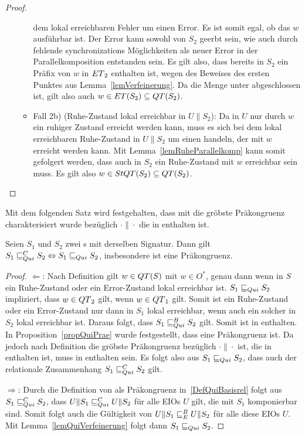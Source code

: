 \begin{proof}
\begin{itemize}
\begin{itemize}
          dem lokal erreichbaren Fehler um einen Error. Es ist somit egal, ob
          das $w$ ausführbar ist. Der Error kann sowohl von $S_2$ geerbt sein,
          wie auch durch fehlende synchronizations Möglichkeiten als neuer
          Error in der Parallelkomposition entstanden sein. Es gilt also, dass
          bereits in $S_2$ ein Präfix von $w$ in $ET{}_2$ enthalten ist, wegen
          des Beweises des ersten Punktes aus Lemma~\ref{lemVerfeinerung}. Da
          die Menge \ET{} unter \cont{} abgeschlossen ist, gilt also auch $w\in
          ET{}(S_2)\subseteq QT{}(S_2)$.
        \item Fall 2b) (Ruhe-Zustand lokal erreichbar in $U\|S_2$): Da in $U$
          nur durch $w$ ein ruhiger Zustand erreicht werden kann, muss es sich
          bei dem lokal erreichbaren Ruhe-Zustand in $U\|S_2$ um einen handeln,
          der mit $w$ erreicht werden kann. Mit Lemma~\ref{lemRuheParallelkomp}
          kann somit gefolgert werden, dass auch in $S_2$ ein Ruhe-Zustand mit
          $w$ erreichbar sein muss. Es gilt also $w\in StQT{}(S_2)\subseteq
          QT{}(S_2)$.
      \end{itemize}
  \end{itemize}
\end{proof}

Mit dem folgenden Satz wird festgehalten, dass mit \QRel{} die gröbste
Präkongruenz charakterisiert wurde bezüglich $\cdot\|\cdot$ die in \QBRel{}
enthalten ist.

\begin{satz}
  \label{satzQuiFullAbst}
  Seien $S_1$ und $S_2$ zwei \EIO{}s mit derselben Signatur. Dann gilt
  $S_1\sqsubseteq _{Qui}^C S_2\Leftrightarrow S_1\sqsubseteq _{Qui} S_2$, insbesondere ist \QRel{} eine
  Präkongruenz.
\end{satz}

\begin{proof}
  \glqq{}$\Leftarrow$\grqq{}: Nach Definition gilt $w\in QT{}(S)$ mit $w\in
  O^*$, genau dann wenn in $S$ ein Ruhe-Zustand oder ein Error-Zustand lokal
  erreichbar ist. $S_1\sqsubseteq _{Qui} S_2$ impliziert, dass $w\in QT{}_2$ gilt, wenn
  $w\in QT{}_1$ gilt. Somit ist ein Ruhe-Zustand oder ein Error-Zustand nur dann in
  $S_1$ lokal erreichbar, wenn auch ein solcher in $S_2$ lokal erreichbar ist.
  Daraus folgt, dass $S_1\sqsubseteq _{Qui}^B S_2$ gilt. Somit ist \QRel{} in \QBRel{}
  enthalten. In Proposition~\ref{propQuiPrae} wurde festgestellt, dass \QRel{}
  eine Präkongruenz ist. Da jedoch \QCRel{} nach Definition die gröbste
  Präkongruenz bezüglich $\cdot\|\cdot$ ist, die in \QBRel{} enthalten ist,
  muss \QRel{} in \QCRel{} enthalten sein. Es folgt also aus $S_1\sqsubseteq _{Qui} S_2$,
  dass auch der relationale Zusammenhang $S_1\sqsubseteq _{Qui}^C S_2$ gilt.

  \glqq{}$\Rightarrow$\grqq{}: Durch die Definition von \QCRel{} als
  Präkongruenz in~\ref{DefQuiBasisrel} folgt aus $S_1\sqsubseteq _{Qui}^C{} S_2$, dass
  $U\|S_1\sqsubseteq _{Qui}^C U\|S_2$ für alle EIOs $U$ gilt, die mit $S_1$ komponierbar sind.
  Somit folgt auch die Gültigkeit von $U\|S_1\sqsubseteq _E^B U\|S_2$ für alle diese EIOs
  $U$. Mit Lemma~\ref{lemQuiVerfeinerung} folgt dann $S_1\sqsubseteq _{Qui}{} S_2$.
\end{proof}

